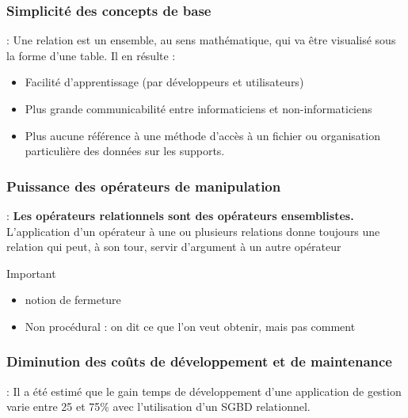 \documentclass[10pt]{beamer}
\begin{document}
\subsubsection{Simplicité des concepts de base}
\begin{frame}{\subsecname : \subsubsecname}
    Une relation est un ensemble, au sens mathématique, qui va être visualisé sous la forme d’une table.
    Il en résulte :
    \begin{itemize}
        \item Facilité d’apprentissage (par développeurs et utilisateurs)
        \item Plus grande communicabilité entre informaticiens et non-informaticiens
        \item Plus aucune référence à une méthode d’accès à un fichier ou organisation particulière des données sur les supports.
    \end{itemize}
\end{frame}

\subsubsection{Puissance des opérateurs de manipulation}
\begin{frame}{\subsecname : \subsubsecname}
    \textbf{Les opérateurs relationnels sont des opérateurs ensemblistes.}
    L’application d’un opérateur à une ou plusieurs relations donne toujours une relation qui peut, à son tour, servir d’argument à un autre opérateur
    \begin{alertblock}{Important}
        \begin{itemize}
            \item notion de fermeture
            \item Non procédural : on dit ce que l'on veut obtenir, mais pas comment
        \end{itemize}
    \end{alertblock}
\end{frame}
\subsubsection{Diminution des coûts de développement et de maintenance}
\begin{frame}{\subsecname : \subsubsecname}
    Il a été estimé que le gain temps de développement d’une application de gestion varie entre 25 et 75\% avec l’utilisation d’un SGBD relationnel.
\end{frame}
\end{document}
